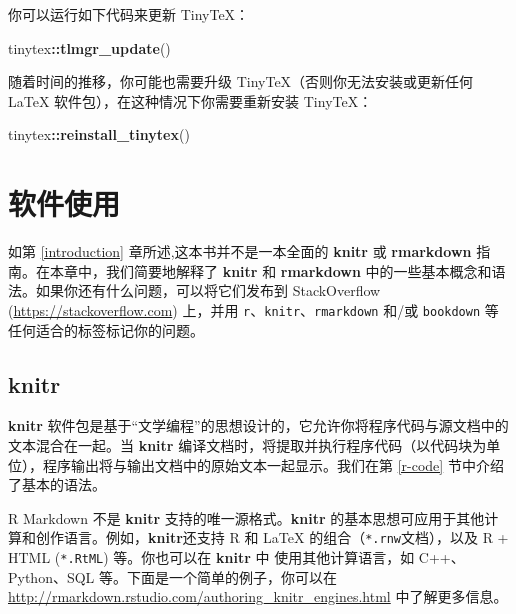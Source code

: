 \documentclass[
  12pt,
]{krantz}
\newenvironment{Shaded}{\begin{snugshade}}{\end{snugshade}}
\newcommand{\FunctionTok}[1]{\textcolor[rgb]{0.13,0.29,0.53}{\textbf{#1}}}
\newcommand{\NormalTok}[1]{#1}
\newcommand{\SpecialCharTok}[1]{\textcolor[rgb]{0.81,0.36,0.00}{\textbf{#1}}}
\theoremstyle{definition}
\theoremstyle{definition}
\theoremstyle{definition}
\theoremstyle{definition}
\theoremstyle{remark}
\begin{document}
你可以运行如下代码来更新 TinyTeX：

\begin{Shaded}
\begin{Highlighting}[]
\NormalTok{tinytex}\SpecialCharTok{::}\FunctionTok{tlmgr\_update}\NormalTok{()}
\end{Highlighting}
\end{Shaded}

随着时间的推移，你可能也需要升级 TinyTeX（否则你无法安装或更新任何 LaTeX 软件包），在这种情况下你需要重新安装 TinyTeX：

\begin{Shaded}
\begin{Highlighting}[]
\NormalTok{tinytex}\SpecialCharTok{::}\FunctionTok{reinstall\_tinytex}\NormalTok{()}
\end{Highlighting}
\end{Shaded}

\hypertarget{software-usage}{%
\chapter{软件使用}\label{software-usage}}

如第 \ref{introduction} 章所述,这本书并不是一本全面的 \textbf{knitr} 或 \textbf{rmarkdown} 指南。在本章中，我们简要地解释了 \textbf{knitr} 和 \textbf{rmarkdown} 中的一些基本概念和语法。如果你还有什么问题，可以将它们发布到 StackOverflow (\url{https://stackoverflow.com}) 上，并用 \texttt{r}、\texttt{knitr}、\texttt{rmarkdown} 和/或 \texttt{bookdown} 等任何适合的标签标记你的问题。

\hypertarget{knitr}{%
\section{knitr}\label{knitr}}

\textbf{knitr} 软件包是基于``文学编程''\citep{knuth1984}的思想设计的，它允许你将程序代码与源文档中的文本混合在一起。当 \textbf{knitr} 编译文档时，将提取并执行程序代码（以代码块为单位），程序输出将与输出文档中的原始文本一起显示。我们在第 \ref{r-code} 节中介绍了基本的语法。

R Markdown 不是 \textbf{knitr} 支持的唯一源格式。\textbf{knitr} 的基本思想可应用于其他计算和创作语言。例如，\textbf{knitr}还支持 R 和 LaTeX 的组合（\texttt{*.rnw}文档），以及 R + HTML (\texttt{*.RtML}) 等。你也可以在 \textbf{knitr} 中 使用其他计算语言，如 C++、Python、SQL 等。下面是一个简单的例子，你可以在 \url{http://rmarkdown.rstudio.com/authoring_knitr_engines.html} 中了解更多信息。
\end{document}
